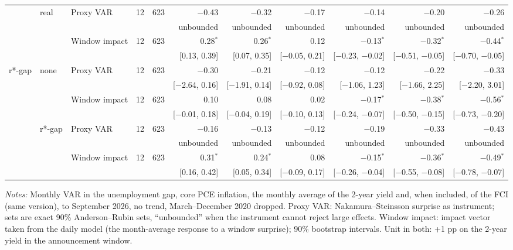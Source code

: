 \begin{table}[tp]
{\begin{tabular}{lllcrrrrrrr}
 & real & Proxy VAR & 12 & 623 & $-$0.43 & $-$0.32 & $-$0.17 & $-$0.14 & $-$0.20 & $-$0.26\\
 & & & & & {\tiny unbounded} & {\tiny unbounded} & {\tiny unbounded} & {\tiny unbounded} & {\tiny unbounded} & {\tiny unbounded}\\
 &  & Window impact & 12 & 623 & 0.28$^{*}$ & 0.26$^{*}$ & 0.12 & $-$0.13$^{*}$ & $-$0.32$^{*}$ & $-$0.44$^{*}$\\
 & & & & & {\tiny [0.13, 0.39]} & {\tiny [0.07, 0.35]} & {\tiny [$-$0.05, 0.21]} & {\tiny [$-$0.23, $-$0.02]} & {\tiny [$-$0.51, $-$0.05]} & {\tiny [$-$0.70, $-$0.05]}\\
\addlinespace
r*-gap & none & Proxy VAR & 12 & 623 & $-$0.30 & $-$0.21 & $-$0.12 & $-$0.12 & $-$0.22 & $-$0.33\\
 & & & & & {\tiny [$-$2.64, 0.16]} & {\tiny [$-$1.91, 0.14]} & {\tiny [$-$0.92, 0.08]} & {\tiny [$-$1.06, 1.23]} & {\tiny [$-$1.66, 2.25]} & {\tiny [$-$2.20, 3.01]}\\
 &  & Window impact & 12 & 623 & 0.10 & 0.08 & 0.02 & $-$0.17$^{*}$ & $-$0.38$^{*}$ & $-$0.56$^{*}$\\
 & & & & & {\tiny [$-$0.01, 0.18]} & {\tiny [$-$0.04, 0.19]} & {\tiny [$-$0.10, 0.13]} & {\tiny [$-$0.24, $-$0.07]} & {\tiny [$-$0.50, $-$0.15]} & {\tiny [$-$0.73, $-$0.20]}\\
 & r*-gap & Proxy VAR & 12 & 623 & $-$0.16 & $-$0.13 & $-$0.12 & $-$0.19 & $-$0.33 & $-$0.43\\
 & & & & & {\tiny unbounded} & {\tiny unbounded} & {\tiny unbounded} & {\tiny unbounded} & {\tiny unbounded} & {\tiny unbounded}\\
 &  & Window impact & 12 & 623 & 0.31$^{*}$ & 0.24$^{*}$ & 0.08 & $-$0.15$^{*}$ & $-$0.36$^{*}$ & $-$0.49$^{*}$\\
 & & & & & {\tiny [0.16, 0.42]} & {\tiny [0.05, 0.34]} & {\tiny [$-$0.09, 0.17]} & {\tiny [$-$0.26, $-$0.04]} & {\tiny [$-$0.55, $-$0.08]} & {\tiny [$-$0.78, $-$0.07]}\\
\bottomrule\end{tabular}}
\begin{flushleft}\footnotesize\textit{Notes:} Monthly VAR in the unemployment gap, core PCE inflation, the monthly average of the 2-year yield and, when included, of the FCI (same version), to September 2026, no trend, March--December 2020 dropped. Proxy VAR: Nakamura--Steinsson surprise as instrument; sets are exact 90\% Anderson--Rubin sets, ``unbounded'' when the instrument cannot reject large effects. Window impact: impact vector taken from the daily model (the month-average response to a window surprise); 90\% bootstrap intervals. Unit in both: +1 pp on the 2-year yield in the announcement window.\end{flushleft}
\end{table}

